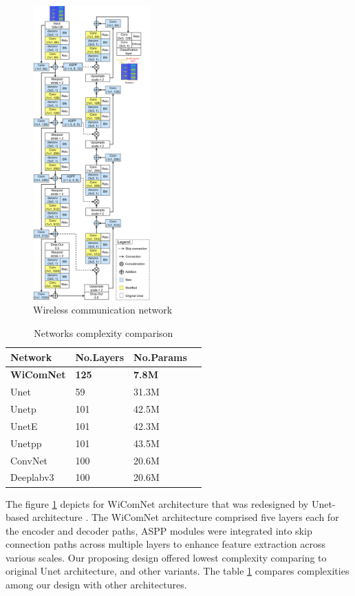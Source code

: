 \documentclass[journal]{IEEEtran} %
\begin{document}
\begin{figure}[!ht]
    \centering
    \includegraphics[width=0.4\textwidth]{img/Design-WiComNetB.jpg}
    \caption{Wireless communication network}
    \label{fig4}
\end{figure}

\begin{table}[!htbp]
\centering
\caption{Networks complexity comparison}
\label{tab1}
\begin{tabular}{|l|l|l|l|}
\toprule
\hline
\textbf{Network} & \textbf{No.Layers} & \textbf{No.Params} \\
\hline
\textbf{WiComNet} & \textbf{125} & \textbf{7.8M} \\
Unet & 59 & 31.3M \\
Unetp & 101 & 42.5M  \\
UnetE & 101 & 42.3M \\
Unetpp & 101 & 43.5M  \\
ConvNet & 100 & 20.6M \\
Deeplabv3 & 100 & 20.6M  \\
\hline
\bottomrule
\end{tabular}
\end{table}


\indent The figure \ref{fig4} depicts for WiComNet architecture that was redesigned by Unet-based architecture \cite{ronneberger2015u}. The WiComNet architecture comprised five layers each for the encoder and decoder paths, ASPP modules were integrated into skip connection paths across multiple layers to enhance feature extraction across various scales. Our proposing design offered lowest complexity comparing to original Unet architecture, and other variants. The table \ref{tab1} compares complexities among our design with other architectures.
\end{document}
